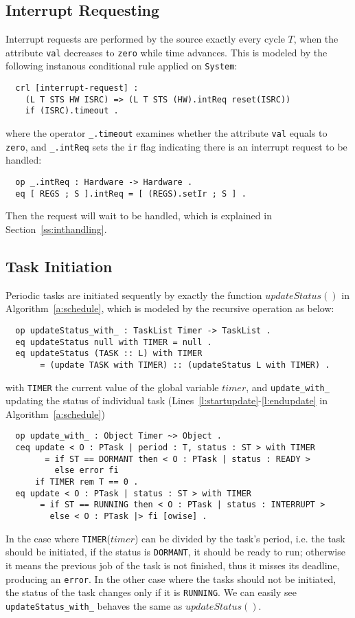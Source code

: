 \documentclass{llncs}
\begin{document}
\subsection{Interrupt Requesting}
Interrupt requests are performed by the source exactly every cycle
$T$, when the attribute \verb|val| decreases to \verb|zero| while time
advances. This is modeled by the following instanous conditional rule
applied on \verb|System|:
\begin{verbatim}
  crl [interrupt-request] :
    (L T STS HW ISRC) => (L T STS (HW).intReq reset(ISRC))
    if (ISRC).timeout .
\end{verbatim}
where the operator \verb|_.timeout| examines whether the attribute
\verb|val| equals to \verb|zero|, and \verb|_.intReq| sets the
\verb|ir| flag indicating there is an interrupt request to be handled:
\begin{verbatim}
  op _.intReq : Hardware -> Hardware .
  eq [ REGS ; S ].intReq = [ (REGS).setIr ; S ] .
\end{verbatim}
Then the request will wait to be handled, which is explained in
Section~\ref{ss:inthandling}.


\subsection{Task Initiation}
Periodic tasks are initiated sequently by exactly the function
$updateStatus()$ in Algorithm~\ref{a:schedule}, which is modeled by
the recursive operation as below:
\begin{verbatim}
  op updateStatus_with_ : TaskList Timer -> TaskList . 
  eq updateStatus null with TIMER = null .
  eq updateStatus (TASK :: L) with TIMER
       = (update TASK with TIMER) :: (updateStatus L with TIMER) .
\end{verbatim}
with \verb|TIMER| the current value of the global variable $timer$,
and \verb|update_with_| updating the status of individual task
(Lines~\ref{l:startupdate}-\ref{l:endupdate} in
Algorithm~\ref{a:schedule})
\begin{verbatim}
  op update_with_ : Object Timer ~> Object .
  ceq update < O : PTask | period : T, status : ST > with TIMER
        = if ST == DORMANT then < O : PTask | status : READY >
          else error fi
      if TIMER rem T == 0 .
  eq update < O : PTask | status : ST > with TIMER
       = if ST == RUNNING then < O : PTask | status : INTERRUPT >
         else < O : PTask |> fi [owise] .
\end{verbatim}
In the case where \verb|TIMER|($timer$) can be divided by the task's
period, i.e. the task should be initiated, if the status is
\verb|DORMANT|, it should be ready to run; otherwise it means the
previous job of the task is not finished, thus it misses its deadline,
producing an \verb|error|. In the other case where the tasks should
not be initiated, the status of the task changes only if it is
\verb|RUNNING|. We can easily see \verb|updateStatus_with_| behaves
the same as $updateStatus()$.
\end{document}
